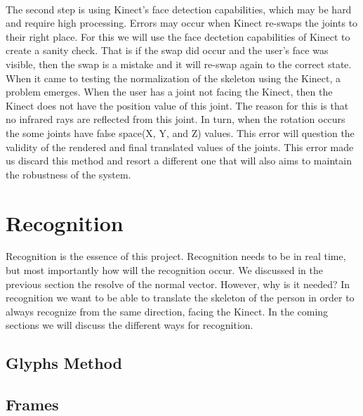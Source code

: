 \\
The second step is using Kinect's face detection capabilities, which may be 
hard and require high processing. Errors may occur when Kinect re-swaps the joints to their right place. For this we will use the face dectetion capabilities of Kinect to create a sanity check. That is if the swap did occur and the user's face was visible, then the swap is a mistake and it will re-swap again to the correct state.
\\
When it came to testing the normalization of the skeleton using the Kinect, a problem emerges. When the user has a joint not facing the Kinect, then the Kinect does not have the position value of this joint. The reason for this is that no infrared rays are reflected from this joint. In turn, when the rotation occurs the some joints have false space(X, Y, and Z) values. This error will question the validity of the rendered and final translated values of the joints. This error made us discard this method and resort a different one that will also aims to maintain the robustness of the system.
\section{Recognition}
Recognition is the essence of this project. Recognition needs to be in real time, but most importantly how will the recognition occur. We discussed in the previous section the resolve of the normal vector. However, why is it needed? In recognition we want to be able to translate the skeleton of the person in order to always recognize from the same direction, facing the Kinect. In the coming sections we will discuss the different ways for recognition.
\subsection{Glyphs Method}
\subsection{Frames}